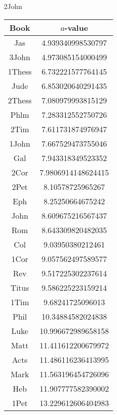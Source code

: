 \documentclass[12pt,letterpaper]{article}
\begin{document}
2John
\begin{longtable}{|c|c|}
\hline
 Book & $a$-value \\ \hline
Jas & 4.939340998530797 \\ \hline
 3John & 4.973085154000499 \\ \hline
 1Thess & 6.732221577764145 \\ \hline
 Jude & 6.853020640291435 \\ \hline
 2Thess & 7.080979993815129 \\ \hline
 Phlm & 7.283312552750726 \\ \hline
 2Tim & 7.611731874976947 \\ \hline
 1John & 7.667529473755046 \\ \hline
 Gal & 7.943318349523352 \\ \hline
 2Cor & 7.9806914148624415 \\ \hline
 2Pet & 8.10578725965267 \\ \hline
 Eph & 8.25250664675242 \\ \hline
 John & 8.609675216567437 \\ \hline
 Rom & 8.643309820482035 \\ \hline
 Col & 9.03950380212461 \\ \hline
 1Cor & 9.057562497589577 \\ \hline
 Rev & 9.517225302237614 \\ \hline
 Titus & 9.586225223159214 \\ \hline
 1Tim & 9.68241725096013 \\ \hline
 Phil & 10.34884582024838 \\ \hline
 Luke & 10.996672989658158 \\ \hline
 Matt & 11.411612200679972 \\ \hline
 Acts & 11.486116236413995 \\ \hline
 Mark & 11.563196454726096 \\ \hline
 Heb & 11.907777582390002 \\ \hline
 1Pet & 13.229612606404983 \\ \hline 
\end{longtable}
\end{document}
